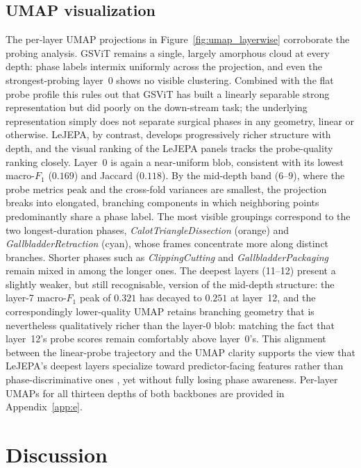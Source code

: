 \documentclass[11pt, a4paper]{article}
\begin{document}
\subsection{UMAP visualization}
The per-layer UMAP projections in Figure~\ref{fig:umap_layerwise}
corroborate the probing analysis. GSViT remains a single, largely
amorphous cloud at every depth: phase labels intermix uniformly across the projection, and even the strongest-probing layer~0 shows no visible clustering. Combined with the flat probe profile this rules out that GSViT has built a linearly separable strong representation but did poorly on the down-stream task; the underlying representation simply does not separate surgical phases in any geometry, linear or otherwise. LeJEPA, by contrast, develops progressively richer structure with depth, and the visual ranking of the LeJEPA panels tracks the probe-quality
ranking closely. Layer~0 is again a near-uniform blob, consistent with its lowest macro-$F_1$ ($0.169$) and Jaccard ($0.118$). By the mid-depth band ($6$--$9$), where the probe metrics peak and the cross-fold variances are smallest, the projection breaks into elongated, branching components in which neighboring points predominantly share a phase
label. The most visible groupings correspond to the two longest-duration phases, \emph{CalotTriangleDissection} (orange) and \emph{GallbladderRetraction} (cyan), whose frames concentrate more along distinct branches. Shorter phases such as \emph{ClippingCutting} and \emph{GallbladderPackaging} remain mixed in among the longer ones. The deepest layers (11--12) present a slightly weaker, but still
recognisable, version of the mid-depth structure: the layer-7 macro-$F_1$ peak of $0.321$ has decayed to $0.251$ at layer~12, and the
correspondingly lower-quality UMAP retains branching geometry that is
nevertheless qualitatively richer than the layer-0 blob: matching the
fact that layer~12's probe scores remain comfortably above layer~0's. This alignment between the linear-probe trajectory and the UMAP clarity 
supports the view that LeJEPA's deepest layers specialize toward 
predictor-facing features rather than phase-discriminative ones 
\parencite{joseph-2026, bolya-2025}, yet without fully losing phase awareness. Per-layer
UMAPs for all thirteen depths of both backbones are provided in
Appendix~\ref{app:e}.
\section{Discussion}
\end{document}
